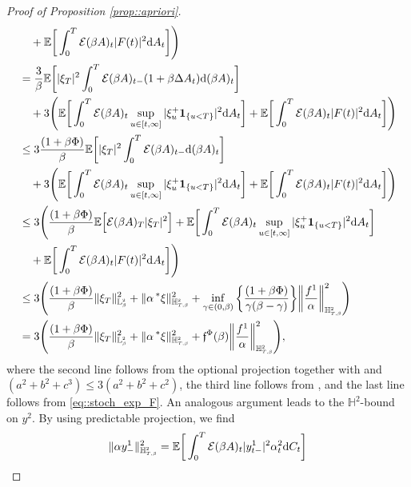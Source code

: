 \documentclass[10pt]{article} %
\newcommand\cE{\mathcal E}
\newcommand{\smalltext}[1]{\text{\fontsize{4}{4}\selectfont$#1$}}
\newcommand\ff{\mathfrak f}
\def \E{\mathbb{E}}
\def \H{\mathbb{H}}
\def \L{\mathbb{L}}
\newcommand{\brs}[1]{\prescript{\ast}{}{#1}}
\newcommand{\1}{\mathbf{1}}
\def\d{\mathrm{d}}
\begin{document}
\begin{proof}[Proof of Proposition \ref{prop::apriori}]
\begin{align*}
	&\quad+ \E \bigg[ \int_0^T \cE(\beta A)_t |F(t)|^2 \d A_t \bigg] \Bigg) \\
	&= \frac{3}{\beta}\E \bigg[ |\xi_T|^2 \int_0^T \cE(\beta A)_{t-}(1+\beta\Delta A_t) \d (\beta A)_t \bigg] \\
	&\quad+3\Bigg( \E \bigg[ \int_0^T \cE(\beta A)_t \sup_{u \in [t,\infty]}|\xi^+_u \mathbf{1}_{\{u < T\}}|^2 \d A_t \bigg] + \E \bigg[ \int_0^T \cE(\beta A)_t |F(t)|^2 \d A_t \bigg] \Bigg) \\
	&\leq 3\frac{(1+\beta\Phi)}{\beta}\E \bigg[ |\xi_T|^2 \int_0^T \cE(\beta A)_{t-} \d (\beta A)_t \bigg]\\
	&\quad+ 3\Bigg( \E \bigg[ \int_0^T \cE(\beta A)_t \sup_{u \in [t,\infty]}|\xi^+_u \mathbf{1}_{\{u < T\}}|^2 \d A_t \bigg] +\E \bigg[ \int_0^T \cE(\beta A)_t |F(t)|^2 \d A_t \bigg] \Bigg) \\
	&\leq 3\Bigg(\frac{(1+\beta\Phi)}{\beta}\E \Big[ \cE(\beta A)_T|\xi_T|^2 \Big] + \E \bigg[ \int_0^T \cE(\beta A)_t \sup_{u \in [t,\infty]}|\xi^+_u \mathbf{1}_{\{u < T\}}|^2 \d A_t \bigg] \\
	&\quad+ \E \bigg[ \int_0^T \cE(\beta A)_t |F(t)|^2 \d A_t \bigg] \Bigg) \\
	&\leq 3 \Bigg( \frac{(1+\beta\Phi)}{\beta} \|\xi_T\|^2_{\L^\smalltext{2}_\smalltext{\beta}} + \|\alpha\brs{\xi}\|^2_{\H^\smalltext{2}_{\smalltext{T}\smalltext{,}\smalltext{\beta}}} +  \inf_{\gamma \in (0,\beta)}\bigg\{\frac{(1+\beta\Phi)}{\gamma(\beta - \gamma)}\bigg\} \bigg\| \frac{f^1}{\alpha} \bigg\|^2_{\H^{\smalltext{2}}_{\smalltext{T}\smalltext{,}\smalltext{\beta}}} \Bigg) \\
	&= 3 \Bigg( \frac{(1+\beta\Phi)}{\beta} \|\xi_T\|^2_{\L^\smalltext{2}_\smalltext{\beta}} + \|\alpha\brs{\xi}\|^2_{\H^\smalltext{2}_{\smalltext{T}\smalltext{,}\smalltext{\beta}}} +  \ff^\Phi(\beta) \bigg\| \frac{f^1}{\alpha} \bigg\|^2_{\H^{\smalltext{2}}_{\smalltext{T}\smalltext{,}\smalltext{\beta}}} \Bigg),
\end{align*}
where the second line follows from the optional projection together with  and $(a^2+b^2+c^3) \leq 3(a^2+b^2+c^2)$, the third line follows from \cite[Theorem VI.57]{dellacherie1982probabilities}, and the last line follows from \eqref{eq::stoch_exp_F}.
An analogous argument leads to the $\H^2$-bound on $y^2$. By using predictable projection, we find
\begin{align*}
	\|\alpha y^1_-\|^2_{\H^\smalltext{2}_{\smalltext{T}\smalltext{,}\smalltext{\beta}}} = \E \bigg[ \int_0^T \cE(\beta A)_t |y^1_{t-}|^2 \alpha^2_t \d C_t \bigg] 

\end{align*}
\end{proof}
\end{document}
